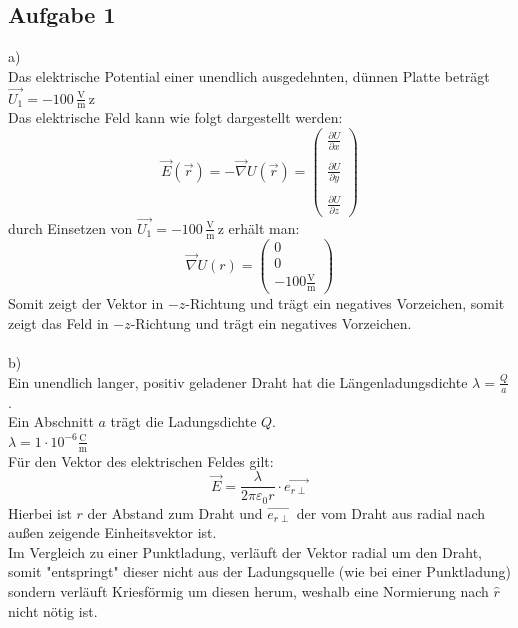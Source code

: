 \documentclass{article}
\begin{document}
\subsection*{Aufgabe 1}
a)\\
Das elektrische Potential einer unendlich ausgedehnten, dünnen Platte beträgt $\vec{U_1} = -100\,\mathrm{\frac{V}{m}\,z}$\\
Das elektrische Feld kann wie folgt dargestellt werden:
\begin{equation*}
    \vec{E}(\vec{r}) = -\vec{\nabla}U(\vec{r}) = \left(\begin{array}{c}\frac{\partial U}{\partial x}\\\\\frac{\partial U}{\partial y}\\\\\frac{\partial U}{\partial z}\end{array}\right)
\end{equation*}
durch Einsetzen von $\vec{U_1} = -100\,\mathrm{\frac{V}{m}\,z}$ erhält man:
\begin{equation*}
    \vec{\nabla}U(r) = \left(\begin{array}{c}0\\0\\-100\mathrm{\frac{V}{m}}\end{array}\right)
\end{equation*}
Somit zeigt der Vektor in $-z$-Richtung und trägt ein negatives Vorzeichen, somit zeigt das Feld in $-z$-Richtung und trägt ein negatives Vorzeichen.\\\\
b)\\
Ein unendlich langer, positiv geladener Draht hat die Längenladungsdichte $\lambda = \frac{Q}{a}$.\\
Ein Abschnitt $a$ trägt die Ladungsdichte $Q$.\\
$\lambda = 1\cdot 10^{-6} \mathrm{\frac{C}{m}}$\\
Für den Vektor des elektrischen Feldes gilt:
\begin{equation*}
    \vec{E} = \frac{\lambda}{2\pi \varepsilon_0 r} \cdot \vec{e_{r\perp}}
\end{equation*}
Hierbei ist $r$ der Abstand zum Draht und $\vec{e_{r\perp}}$ der vom Draht aus radial nach außen zeigende Einheitsvektor ist.\\
Im Vergleich zu einer Punktladung, verläuft der Vektor radial um den Draht, somit "entspringt" dieser nicht aus der Ladungsquelle (wie bei einer Punktladung) sondern verläuft Kriesförmig um diesen herum, weshalb eine Normierung nach $\hat{r}$ nicht nötig ist.\\
\end{document}

